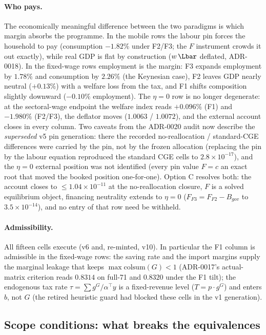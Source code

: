 \paragraph{Who pays.} The economically meaningful difference between the
two paradigms is which margin absorbs the programme. In the mobile rows the
labour pin forces the household to pay (consumption $-1.82\%$ under F2/F3;
the $F$ instrument crowds it out exactly), while real GDP is flat by
construction ($w\,\Lbar$ deflated, ADR-0018). In the fixed-wage rows
employment is the margin: F3 expands employment by $1.78\%$ and consumption
by $2.26\%$ (the Keynesian case), F2 leaves GDP nearly neutral
($+0.13\%$) with a welfare loss from the tax, and F1 shifts composition
slightly downward ($-0.10\%$ employment). The
$\eta = 0$ row is no longer degenerate: at the sectoral-wage endpoint the
welfare index reads $+0.096\%$ (F1) and $-1.980\%$ (F2/F3), the deflator
moves ($1.0063$ / $1.0072$), and the external account closes in every
column. Two caveats from the ADR-0020 audit now describe the
\emph{superseded} v5 pin generation: there the recorded
no-reallocation / standard-CGE
differences were carried by the pin, not by the frozen allocation
(replacing the pin by the labour equation reproduced the standard CGE cells
to
$2.8\times10^{-17}$), and the $\eta = 0$ external position was not
identified (every pin value $F = c$ an exact root that moved the booked
position one-for-one). Option C resolves both: the account closes to
$\le 1.04\times10^{-11}$ at the no-reallocation closure, $F$ is a solved
equilibrium object,
financing neutrality extends to $\eta = 0$ ($F_{F3} = F_{F2} - B_{gov}$ to
$3.5\times10^{-14}$), and no entry of that row need be withheld.

\paragraph{Admissibility.} All fifteen cells execute
(v6 and, re-minted, v10). In particular the F1 column is
admissible in the fixed-wage
rows: the saving rate and the import margins supply the
marginal leakage that keeps $\max \mathrm{colsum}(G) < 1$ (ADR-0017's
actual-matrix criterion reads $0.8314$ on full-71 and $0.8320$ under the F1
tilt); the endogenous tax rate $\tau = \sum g^G/\alpha^{\!\top}y$ is a
fixed-revenue level ($T = p\!\cdot\!g^G$) and enters $b$, not $G$ (the retired heuristic guard had blocked these
cells in the v1 generation).

\subsection{Scope conditions: what breaks the equivalences}\label{sec:scope}

